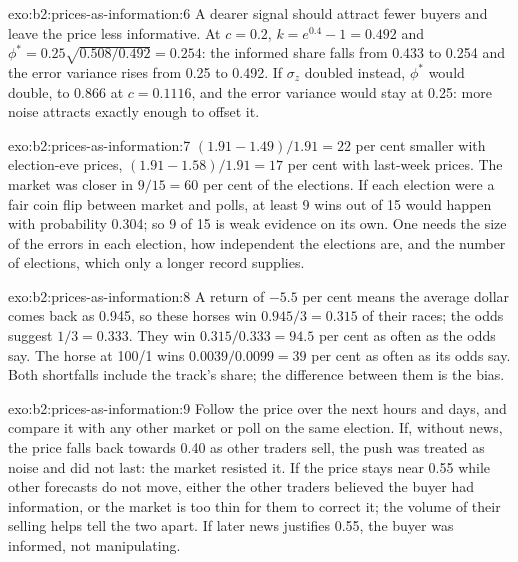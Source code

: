 \begin{solution}{exo:b2:prices-as-information:6}
A dearer signal should attract fewer buyers and leave the price less informative. At $c = 0.2$, $k = e^{0.4} -
1 = 0.492$ and $\phi^* = 0.25\sqrt{0.508/0.492} = 0.254$: the informed share falls from 0.433 to 0.254 and the
error variance rises from 0.25 to 0.492. If $\sigma_z$ doubled instead, $\phi^*$ would double, to 0.866 at
$c = 0.1116$, and the error variance would stay at 0.25: more noise attracts exactly enough  to offset it.
\end{solution}

\begin{solution}{exo:b2:prices-as-information:7}
$(1.91 - 1.49)/1.91 = 22$ per cent smaller with election-eve prices, $(1.91 - 1.58)/1.91 = 17$ per cent with
last-week prices. The market was closer in $9/15 = 60$ per cent of the elections. If each election were a
fair coin flip between market and polls, at least 9 wins out of 15 would happen with probability 0.304; so
9 of 15 is weak evidence on its own. One needs the size of the errors in each election, how independent the
elections are, and the number of elections, which only a longer record supplies.
\end{solution}

\begin{solution}{exo:b2:prices-as-information:8}
A return of $-5.5$ per cent means the average dollar comes back as 0.945, so these horses win $0.945/3 =
0.315$ of their races; the odds suggest $1/3 = 0.333$. They win $0.315/0.333 = 94.5$ per cent as often as the
odds say. The horse at 100/1 wins $0.0039/0.0099 = 39$ per cent as often as its odds say. Both shortfalls
include the track's share; the difference between them is the bias.
\end{solution}

\begin{solution}{exo:b2:prices-as-information:9}
Follow the price over the next hours and days, and compare it with any other market or poll on the same
election. If, without news, the price falls back towards 0.40 as other traders sell, the push was treated
as noise and did not last: the market resisted it. If the price stays near 0.55 while other forecasts do
not move, either the other traders believed the buyer had information, or the market is too thin for
them to correct it; the volume of their selling helps tell the two apart. If later news justifies 0.55, the
buyer was informed, not manipulating.
\end{solution}

